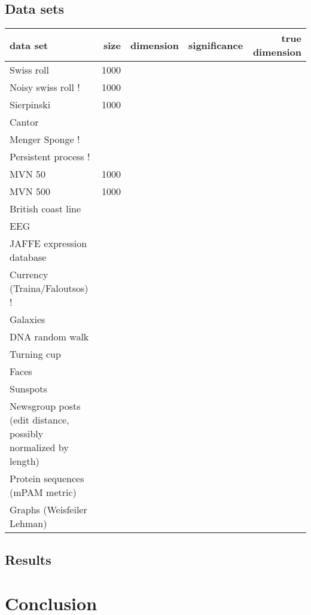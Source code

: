 \documentclass[10pt]{article}
\begin{document}
\subsection{Data sets}

\pagebreak
\begin{landscape}

\begin{tabular}{l | r r r r}
\hline
data set & size & dimension & significance & true dimension \\
\hline
Swiss roll & 1000 & & & \\
Noisy swiss roll ! & 1000 & & & \\ 
Sierpinski & 1000 & & & \\
Cantor & & & & \\
Menger Sponge ! & & & & \\
Persistent process ! & & & & \\
  
MVN 50 & 1000 & & & \\ 
MVN 500 & 1000 & & & \\
 
British coast line & & & & \\
   
EEG & & & & \\
JAFFE expression database & & & & \\
Currency (Traina/Faloutsos) ! & & & & \\
Galaxies & & & & \\
DNA random walk & & & & \\
Turning cup & & & & \\ 
Faces & & & & \\ 
Sunspots & & & & \\

Newsgroup posts (edit distance, possibly normalized by length) & & & & \\
Protein sequences (mPAM metric) & & & & \\
Graphs (Weisfeiler Lehman) & & & & \\
\hline
\end{tabular}

\end{landscape}
\pagebreak

\subsection{Results}

\section{Conclusion}
\end{document}
